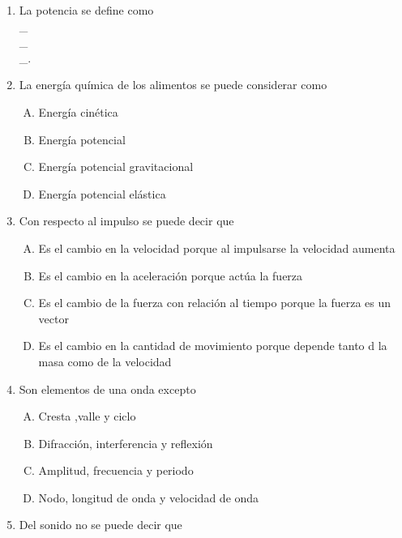 \begin{enumerate}
\item La potencia se define como \label{yolf-15}\hrulefill\\
\_\hrulefill\\
\_\hrulefill\\
\_\hrulefill.

\item La energía química de los alimentos se puede considerar como \label{yolf-16}\\

\begin{enumerate}[(A)]
\item  Energía cinética
\item  Energía potencial
\item  Energía potencial gravitacional
\item  Energía potencial elástica
\end{enumerate}

\item Con respecto al impulso se puede decir que \label{yolf-17}\\
\begin{enumerate}[(A)]
\item  Es el cambio en la velocidad porque al impulsarse la velocidad aumenta
\item  Es el cambio en la aceleración porque actúa la fuerza
\item  Es el cambio de la fuerza con relación al tiempo porque la fuerza es un vector
\item  Es el cambio en la cantidad de movimiento porque depende tanto d la masa como de la velocidad
\end{enumerate}

\item  Son elementos de una onda excepto \label{yolf-18}\\

\begin{enumerate}[(A)]
\item  Cresta ,valle y ciclo
\item  Difracción, interferencia y reflexión
\item  Amplitud, frecuencia y periodo
\item  Nodo, longitud de onda y velocidad de onda
\end{enumerate}

\item  Del sonido no se puede decir que  \label{yolf-19}\\


\end{enumerate}
